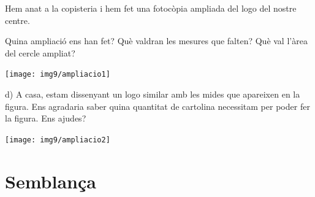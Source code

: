 
\begin{iniaval}
	
    \begin{minipage}{0.6\textwidth}
			Hem anat a la copisteria i hem fet una fotocòpia ampliada del logo del nostre centre.
			
			\begin{tasks}
			 \task Quina ampliació ens han fet?
			 \task Què valdran les mesures que falten?
			 \task Què val l'àrea del cercle ampliat?
			 \end{tasks}
	\end{minipage}
	\begin{minipage}{0.4\textwidth}
		\centering
			\texttt{[image: img9/ampliacio1]}
	\end{minipage}
	 
	 \vso\vso
	
	 \begin{minipage}{0.65\textwidth}
	  d) A casa, estam dissenyant un logo similar amb les mides que apareixen en la figura. Ens agradaria saber quina quantitat de cartolina necessitam per poder fer la figura.  Ens ajudes?

	 \end{minipage}
	 \begin{minipage}{0.35\textwidth}
	 	\centering
	 	\texttt{[image: img9/ampliacio2]}
	 \end{minipage}
	 \vsoo
	 
\end{iniaval}

\newpage
\section{Semblança}

